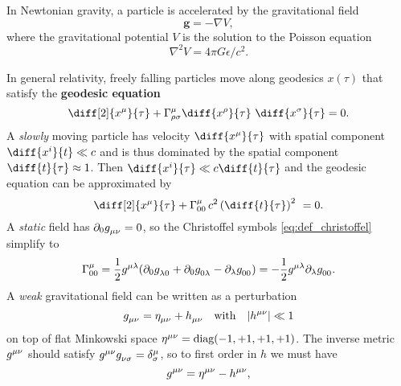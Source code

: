 In Newtonian gravity, a particle is accelerated by the gravitational field
\begin{equation}
	\mathbf{g} = - \nabla V ,
	\label{eq:interpretation_m:newton2}
\end{equation}
where the gravitational potential $V$ is the solution to the Poisson equation
\begin{equation}
	\nabla^2 V = 4 \pi G \epsilon/c^2 .
	\label{eq:interpretation_m:poisson}
\end{equation}

In general relativity, freely falling particles move along geodesics $x(\tau)$ that satisfy the \textbf{geodesic equation}
\begin{equation}
	\diff[2]{x^\mu}{\tau} + \Gamma^\mu_{\rho \sigma} \diff{x^\rho}{\tau} \diff{x^\sigma}{\tau} = 0 .
	\label{eq:geodesic}
\end{equation}
A \emph{slowly} moving particle has velocity $\diff{x^\mu}{\tau}$ with spatial component $\diff{x^i}{t} \ll c$ and is thus dominated by the spatial component $\diff{t}{\tau} \approx 1$.
Then $\diff{x^i}{\tau} \ll c \diff{t}{\tau}$ and the geodesic equation can be approximated by
\begin{equation*}
	\diff[2]{x^\mu}{\tau} + \Gamma^\mu_{00} \, c^2 \left( \diff{t}{\tau} \right)^2 = 0 .
\end{equation*}
A \emph{static} field has $\partial_0 g\indices{_\mu_\nu} = 0$, so the Christoffel symbols \eqref{eq:def_christoffel} simplify to
\begin{equation*}
	\Gamma^\mu_{00} = \frac{1}{2} g\indices{^\mu^\lambda} (\partial_0 g\indices{_\lambda_0} + \partial_0 g\indices{_0_\lambda} - \partial_\lambda g\indices{_0_0}) = -\frac{1}{2} g\indices{^\mu^\lambda} \partial_\lambda g\indices{_0_0} .
\end{equation*}
A \emph{weak} gravitational field can be written as a perturbation 
\begin{equation}
	g\indices{_\mu_\nu} = \eta\indices{_\mu_\nu} + h\indices{_\mu_\nu}
	\quad \text{with} \quad
	\abs{h\indices{^\mu^\nu}} \ll 1
	\label{eq:weak_field_limit:metric_perturbation}
\end{equation}
on top of flat Minkowski space $\eta\indices{^\mu^\nu} = \text{diag}(-1, +1, +1, +1)$.
The inverse metric $g\indices{^\mu^\nu}$ should satisfy $g\indices{^\mu^\nu} g\indices{_\nu_\sigma} = \delta^\mu_\sigma$, so to first order in $h$ we must have
\begin{equation*}
	g\indices{^\mu^\nu} = \eta\indices{^\mu^\nu} - h\indices{^\mu^\nu} ,
\end{equation*}
